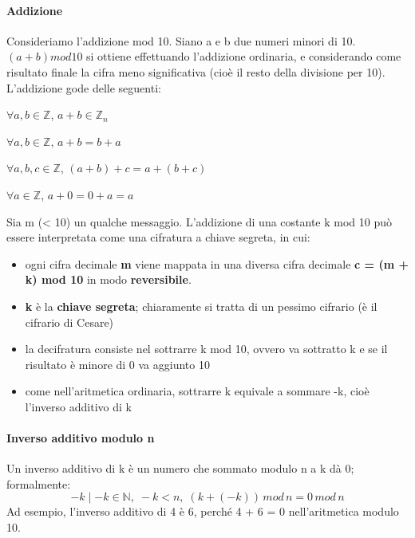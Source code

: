 \paragraph{Addizione}
Consideriamo l'addizione mod 10. Siano a e b due numeri minori di 10. $(a + b)mod10$ si ottiene effettuando l'addizione ordinaria, e considerando come risultato finale la cifra meno significativa (cioè il resto della divisione per 10). L'addizione gode delle seguenti:
\begin{prop}
$\forall a,b \in \mathbb{Z}$, $a + b \in \mathbb{Z}_n$ 
\end{prop}
\begin{prop}[(Commutativa)]
$\forall a,b \in \mathbb{Z}$, $a + b = b + a$ 
\end{prop}
\begin{prop}[(Associativa)]
$\forall a,b,c \in \mathbb{Z}$, $(a + b) + c = a + (b + c)$ 
\end{prop}
\begin{prop}
$\forall a \in \mathbb{Z}$, $a + 0 = 0 + a = a$ 
\end{prop}
Sia m (< 10) un qualche messaggio. L'addizione di una costante k mod 10 può essere interpretata come una cifratura a chiave segreta, in cui:
\begin{itemize}
\item ogni cifra decimale \textbf{m} viene mappata in una diversa cifra decimale \textbf{c = (m + k) mod 10} in modo \textbf{reversibile}.
\item \textbf{k} è la \textbf{chiave segreta}; chiaramente si tratta di un pessimo cifrario (è il cifrario di Cesare)
\item la decifratura consiste nel sottrarre k mod 10, ovvero va sottratto k e se il risultato è minore di 0 va aggiunto 10
\item come nell’aritmetica ordinaria, sottrarre k equivale a sommare -k, cioè l’inverso additivo di k
\end{itemize}

\paragraph{Inverso additivo modulo n}
Un inverso additivo di k è un numero che sommato modulo n a k dà 0; formalmente: 
\begin{equation}
-k \mid -k \in \mathbb{N},\; -k < n,\; (k + (-k)) \, mod \, n = 0 \, mod \, n
\end{equation}
Ad esempio, l’inverso additivo di 4 è 6, perché 4 + 6 = 0 nell'aritmetica modulo 10.

